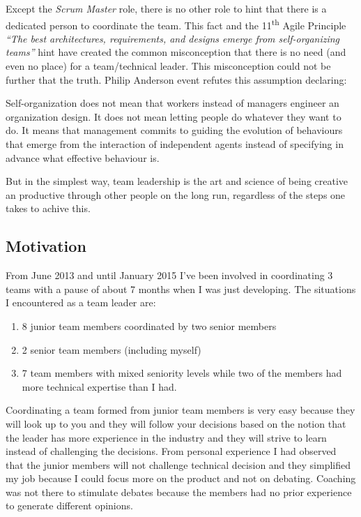 Except the \textit{{Scrum Master}} role, there is no other role to hint that there is a dedicated person to coordinate the team. This fact and the 11\textsuperscript{th} Agile Principle \textit{``The best architectures, requirements, and designs emerge from self-organizing teams''}\cite{agile-manifesto} hint have created the common misconception that there is no need (and even no place) for a team/technical leader. This misconception could not be further that the truth. Philip Anderson event refutes this assumption declaring:

\begin{displayquote}
Self-organization does not mean that workers instead of managers engineer an organization design. It does not mean letting people do whatever they want to do. It means that management commits to guiding the evolution of behaviours that emerge from the interaction of independent agents instead of specifying in advance what effective behaviour is.
\end{displayquote}

But in the simplest way, team leadership is the art and science of being creative an productive through other people on the long run, regardless of the steps one takes to achive this.


\subsection{Motivation}
\label{sub-sec:motivation}

From June 2013 and until January 2015 I've been involved in coordinating 3 teams with a pause of about 7 months when I was just developing. The situations I encountered as a team leader are:

\begin{enumerate}
\item 8 junior team members coordinated by two senior members
\item 2 senior team members (including myself)
\item 7 team members with mixed seniority levels while two of the members had more technical expertise than I had.
\end{enumerate}

Coordinating a team formed from junior team members is very easy because they will look up to you and they will follow your decisions based on the notion that the leader has more experience in the industry and they will strive to learn instead of challenging the decisions. From personal experience I had observed that the junior members will not challenge technical decision and they simplified my job because I could focus more on the product and not on debating. Coaching was not there to stimulate debates because the members had no prior experience to generate different opinions.

